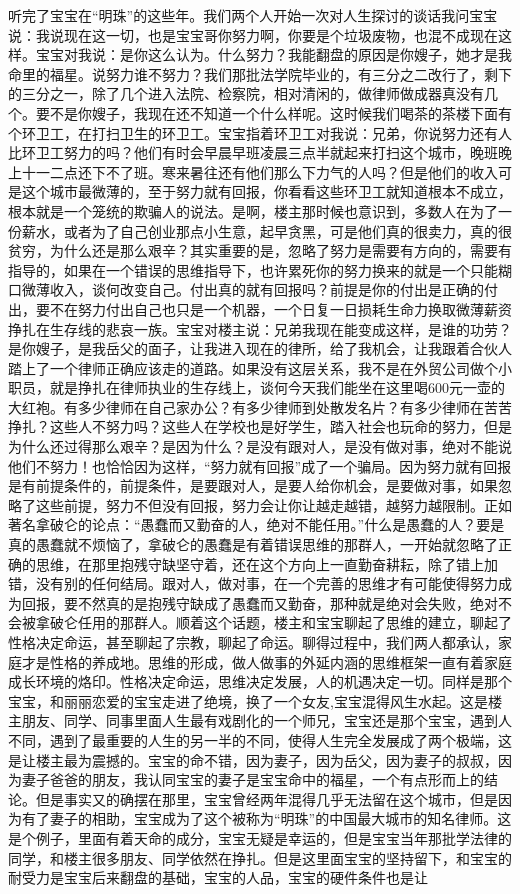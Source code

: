 听完了宝宝在“明珠”的这些年。我们两个人开始一次对人生探讨的谈话我问宝宝说：我说现在这一切，也是宝宝哥你努力啊，你要是个垃圾废物，也混不成现在这样。宝宝对我说：是你这么认为。什么努力？我能翻盘的原因是你嫂子，她才是我命里的福星。说努力谁不努力？我们那批法学院毕业的，有三分之二改行了，剩下的三分之一，除了几个进入法院、检察院，相对清闲的，做律师做成器真没有几个。要不是你嫂子，我现在还不知道一个什么样呢。这时候我们喝茶的茶楼下面有个环卫工，在打扫卫生的环卫工。宝宝指着环卫工对我说：兄弟，你说努力还有人比环卫工努力的吗？他们有时会早晨早班凌晨三点半就起来打扫这个城市，晚班晚上十一二点还下不了班。寒来暑往还有他们那么下力气的人吗？但是他们的收入可是这个城市最微薄的，至于努力就有回报，你看看这些环卫工就知道根本不成立，根本就是一个笼统的欺骗人的说法。是啊，楼主那时候也意识到，多数人在为了一份薪水，或者为了自己创业那点小生意，起早贪黑，可是他们真的很卖力，真的很贫穷，为什么还是那么艰辛？其实重要的是，忽略了努力是需要有方向的，需要有指导的，如果在一个错误的思维指导下，也许累死你的努力换来的就是一个只能糊口微薄收入，谈何改变自己。付出真的就有回报吗？前提是你的付出是正确的付出，要不在努力付出自己也只是一个机器，一个日复一日损耗生命力换取微薄薪资挣扎在生存线的悲哀一族。宝宝对楼主说：兄弟我现在能变成这样，是谁的功劳？是你嫂子，是我岳父的面子，让我进入现在的律所，给了我机会，让我跟着合伙人踏上了一个律师正确应该走的道路。如果没有这层关系，我不是在外贸公司做个小职员，就是挣扎在律师执业的生存线上，谈何今天我们能坐在这里喝600元一壶的大红袍。有多少律师在自己家办公？有多少律师到处散发名片？有多少律师在苦苦挣扎？这些人不努力吗？这些人在学校也是好学生，踏入社会也玩命的努力，但是为什么还过得那么艰辛？是因为什么？是没有跟对人，是没有做对事，绝对不能说他们不努力！也恰恰因为这样，“努力就有回报”成了一个骗局。因为努力就有回报是有前提条件的，前提条件，是要跟对人，是要人给你机会，是要做对事，如果忽略了这些前提，努力不但没有回报，努力会让你让越走越错，越努力越限制。正如著名拿破仑的论点：“愚蠢而又勤奋的人，绝对不能任用。”什么是愚蠢的人？要是真的愚蠢就不烦恼了，拿破仑的愚蠢是有着错误思维的那群人，一开始就忽略了正确的思维，在那里抱残守缺坚守着，还在这个方向上一直勤奋耕耘，除了错上加错，没有别的任何结局。跟对人，做对事，在一个完善的思维才有可能使得努力成为回报，要不然真的是抱残守缺成了愚蠢而又勤奋，那种就是绝对会失败，绝对不会被拿破仑任用的那群人。顺着这个话题，楼主和宝宝聊起了思维的建立，聊起了性格决定命运，甚至聊起了宗教，聊起了命运。聊得过程中，我们两人都承认，家庭才是性格的养成地。思维的形成，做人做事的外延内涵的思维框架一直有着家庭成长环境的烙印。性格决定命运，思维决定发展，人的机遇决定一切。同样是那个宝宝，和丽丽恋爱的宝宝走进了绝境，换了一个女友,宝宝混得风生水起。这是楼主朋友、同学、同事里面人生最有戏剧化的一个师兄，宝宝还是那个宝宝，遇到人不同，遇到了最重要的人生的另一半的不同，使得人生完全发展成了两个极端，这是让楼主最为震撼的。宝宝的命不错，因为妻子，因为岳父，因为妻子的叔叔，因为妻子爸爸的朋友，我认同宝宝的妻子是宝宝命中的福星，一个有点形而上的结论。但是事实又的确摆在那里，宝宝曾经两年混得几乎无法留在这个城市，但是因为有了妻子的相助，宝宝成为了这个被称为“明珠”的中国最大城市的知名律师。这是个例子，里面有着天命的成分，宝宝无疑是幸运的，但是宝宝当年那批学法律的同学，和楼主很多朋友、同学依然在挣扎。但是这里面宝宝的坚持留下，和宝宝的耐受力是宝宝后来翻盘的基础，宝宝的人品，宝宝的硬件条件也是让